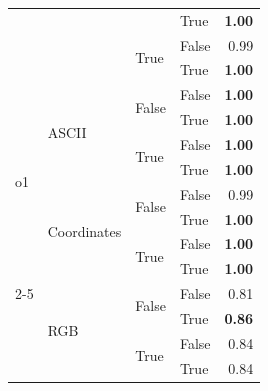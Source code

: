 \begin{tabular}{@{}llllr@{}}
                                    &                                   &                           & True                      & \textbf{1.00} \\
                                    &                                   & \multirow[c]{2}{*}{True}  & False                     & 0.99 \\
                                    &                                   &                           & True                      & \textbf{1.00} \\
    \midrule        
    \multirow[c]{8}{*}{o1}          & \multirow[c]{4}{*}{ASCII}         & \multirow[c]{2}{*}{False} & False                     & \textbf{1.00} \\
                                    &                                   &                           & True                      & \textbf{1.00} \\
                                    &                                   & \multirow[c]{2}{*}{True}  & False                     & \textbf{1.00} \\
                                    &                                   &                           & True                      & \textbf{1.00} \\
    \cmidrule{2-5}                                                                                                                 
                                    & \multirow[c]{4}{*}{Coordinates}   & \multirow[c]{2}{*}{False} & False                     & 0.99 \\
                                    &                                   &                           & True                      & \textbf{1.00} \\
                                    &                                   & \multirow[c]{2}{*}{True}  & False                     & \textbf{1.00} \\
                                    &                                   &                           & True                      & \textbf{1.00} \\
    \cmidrule{2-5}                                                                                                                  
                                    & \multirow[c]{4}{*}{RGB}           & \multirow[c]{2}{*}{False} & False                     & 0.81 \\
                                    &                                   &                           & True                      & \textbf{0.86} \\
                                    &                                   & \multirow[c]{2}{*}{True}  & False                     & 0.84 \\
                                    &                                   &                           & True                      & 0.84 \\
   \bottomrule
\end{tabular}
